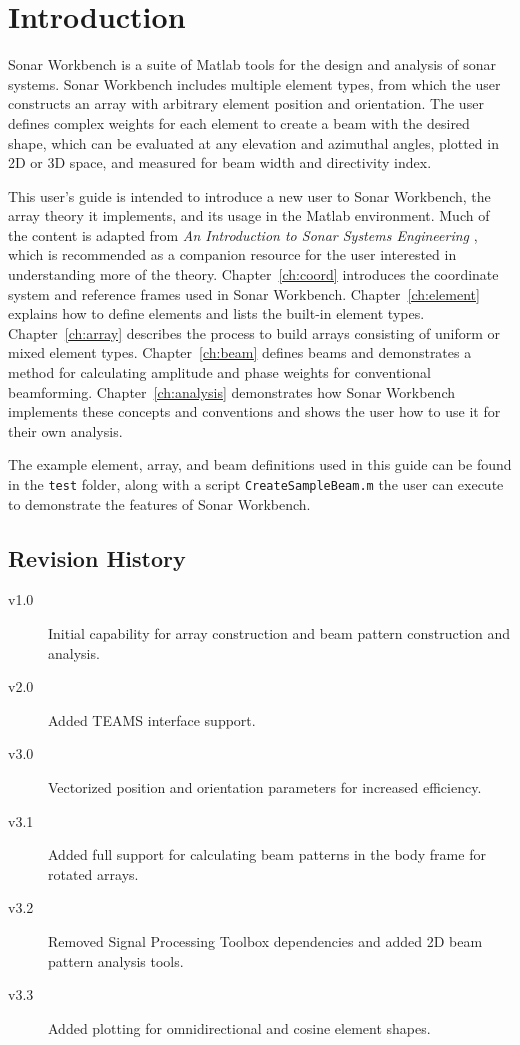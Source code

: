 \chapter{Introduction}\label{ch:intro}

Sonar Workbench is a suite of Matlab tools for the design and analysis of sonar systems. Sonar Workbench includes multiple element types, from which the user constructs an array with arbitrary element position and orientation. The user defines complex weights for each element to create a beam with the desired shape, which can be evaluated at any elevation and azimuthal angles, plotted in 2D or 3D space, and measured for beam width and directivity index.

This user's guide is intended to introduce a new user to Sonar Workbench, the array theory it implements, and its usage in the Matlab environment. Much of the content is adapted from \emph{An Introduction to Sonar Systems Engineering} \cite{Ziomek}, which is recommended as a companion resource for the user interested in understanding more of the theory. Chapter~\ref{ch:coord} introduces the coordinate system and reference frames used in Sonar Workbench. Chapter~\ref{ch:element} explains how to define elements and lists the built-in element types. Chapter~\ref{ch:array} describes the process to build arrays consisting of uniform or mixed element types. Chapter~\ref{ch:beam} defines beams and demonstrates a method for calculating amplitude and phase weights for conventional beamforming. Chapter~\ref{ch:analysis} demonstrates how Sonar Workbench implements these concepts and conventions and shows the user how to use it for their own analysis.

The example element, array, and beam definitions used in this guide can be found in the \texttt{test} folder, along with a script \texttt{CreateSampleBeam.m} the user can execute to demonstrate the features of Sonar Workbench. 

\section*{Revision History}

\begin{description}
\item[v1.0] Initial capability for array construction and beam pattern construction and analysis. 
\item[v2.0] Added TEAMS interface support. 
\item[v3.0] Vectorized position and orientation parameters for increased efficiency. 
\item[v3.1] Added full support for calculating beam patterns in the body frame for rotated arrays. 
\item[v3.2] Removed Signal Processing Toolbox dependencies and added 2D beam pattern analysis tools. 
\item[v3.3] Added plotting for omnidirectional and cosine element shapes.
\end{description}